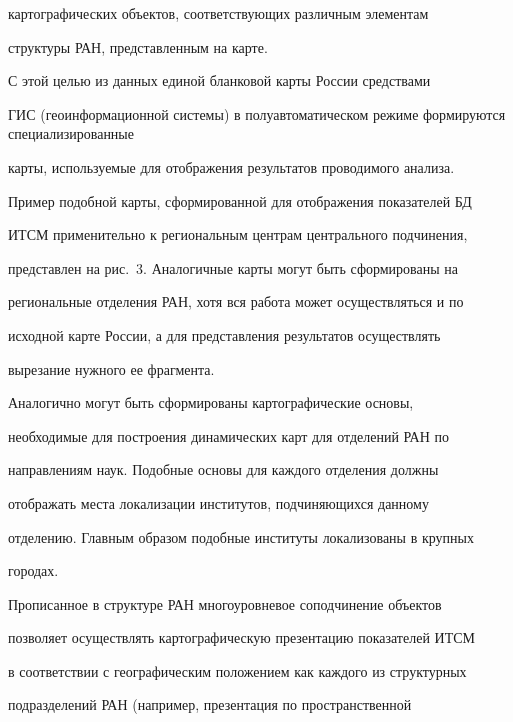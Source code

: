 картографических объектов, соответствующих различным элементам 


структуры РАН, представленным на карте.


     


     С этой целью из данных единой бланковой карты России средствами 


ГИС (геоинформационной системы) в полуавтоматическом режиме формируются специализированные 


карты, используемые для отображения результатов проводимого анализа. 


Пример подобной карты, сформированной для отображения показателей БД 


ИТСМ применительно к региональным центрам центрального подчинения, 


представлен на рис.~3. Аналогичные карты могут быть сформированы на 


региональные отделения РАН, хотя вся работа может осуществляться и по 


исходной карте России, а для представления результатов осуществлять 


вырезание нужного ее фрагмента.


     





     


     Аналогично могут быть сформированы картографические основы, 


необходимые для построения динамических карт для отделений РАН по 


направлениям наук. Подобные основы для каждого отделения должны 


отображать места локализации институтов, подчиняющихся данному 


отделению. Главным образом подобные институты локализованы в крупных 


городах. 


     


     Прописанное в структуре РАН многоуровневое соподчинение объектов 


позволяет осуществлять картографическую  презентацию показателей ИТСМ 


в соответствии с географическим положением как каждого из структурных 


подразделений РАН (например, презентация по пространственной  


